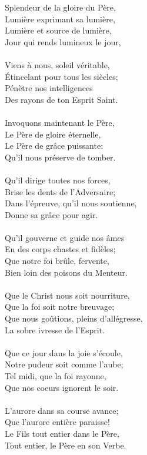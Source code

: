 Splendeur de la gloire du Père,\\
Lumière exprimant sa lumière,\\
Lumière et source de lumière,\\
Jour qui rends lumineux le jour,\\
\\
Viens à nous, soleil véritable,\\
Étincelant pour tous les siècles;\\
Pénètre nos intelligences\\
Des rayons de ton Esprit Saint.\\
\\
Invoquons maintenant le Père,\\
Le Père de gloire éternelle,\\
Le Père de grâce puissante:\\
Qu’il nous préserve de tomber.\\
\\
Qu’il dirige toutes nos forces,\\
Brise les dents de l’Adversaire;\\
Dans l’épreuve, qu’il nous soutienne,\\
Donne sa grâce pour agir.\\
\\
Qu’il gouverne et guide nos âmes\\
En des corps chastes et fidèles;\\
Que notre foi brûle, fervente,\\
Bien loin des poisons du Menteur.\\
\\
Que le Christ nous soit nourriture,\\
Que la foi soit notre breuvage;\\
Que nous goûtions, pleins d’allégresse,\\
La sobre ivresse de l’Esprit.\\
\\
Que ce jour dans la joie s’écoule,\\
Notre pudeur soit comme l’aube;\\
Tel midi, que la foi rayonne,\\
Que nos coeurs ignorent le soir.\\
\\
L’aurore dans sa course avance;\\
Que l'aurore entière paraisse!\\
Le Fils tout entier dans le Père,\\
Tout entier, le Père en son Verbe.